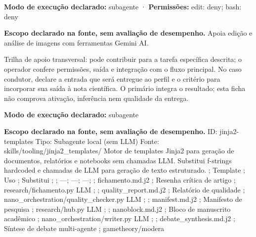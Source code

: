 \begin{arquitetura}
\textbf{Modo de execução declarado:} subagente · \textbf{Permissões:} edit: deny; bash: deny
\end{arquitetura}


\begin{descricao}
\textbf{Escopo declarado na fonte, sem avaliação de desempenho.}
Apoia edição e análise de imagens com ferramentas Gemini AI.
\end{descricao}

\begin{funcao}
Trilha de apoio transversal: pode contribuir para a tarefa específica descrita; o operador confere permissões, saída e integração com o fluxo principal. No caso condutor, declare a entrada que será entregue ao perfil e o critério para incorporar sua saída à nota científica. O primário integra o resultado; esta ficha não comprova ativação, inferência nem qualidade da entrega.
\end{funcao}

\begin{arquitetura}
\textbf{Modo de execução declarado:} subagente
\end{arquitetura}


\begin{descricao}
\textbf{Escopo declarado na fonte, sem avaliação de desempenho.}
ID: jinja2-templates Tipo: Subagente local (sem LLM) Fonte: skills/tooling/jinja2\_templates/ Motor de templates Jinja2 para geração de documentos, relatórios e notebooks sem chamadas LLM. Substitui f-strings hardcoded e chamadas de LLM para geração de texto estruturado. ; Template ; Uso ; Substitui ; ; ---; ---; ---; ; fichamento.md.j2 ; Resenha crítica de artigo ; research/fichamento.py LLM ; ; quality\_report.md.j2 ; Relatório de qualidade ; nano\_orchestration/quality\_checker.py LLM ; ; manifest.md.j2 ; Manifesto de pesquisa ; research/hub.py LLM ; ; nanoblock.md.j2 ; Bloco de manuscrito acadêmico ; nano\_orchestration/writer.py LLM ; ; debate\_synthesis.md.j2 ; Síntese de debate multi-agente ; gametheory/modera
\end{descricao}

